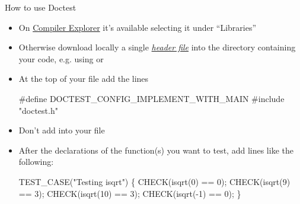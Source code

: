 \begin{frame}[fragile]{How to use Doctest}

  \begin{itemize}
  \item On \href{https://godbolt.org/}{Compiler Explorer} it's available
    selecting it under ``Libraries''
  \item Otherwise download locally a single
    \href{https://raw.githubusercontent.com/doctest/doctest/master/doctest/doctest.h}{\textit{header
        file}} into the directory containing your code, e.g. using 
    or 
  \item At the top of your \Cpp{} file add the lines
    \begin{codeblock}
#define DOCTEST\_CONFIG\_IMPLEMENT\_WITH\_MAIN
#include "doctest.h"\end{codeblock}
  \item Don't add  into your file
  \item After the declarations of the function(s) you want to test, add lines
    like the following:
    \begin{codeblock}
TEST_CASE("Testing isqrt") \{
  CHECK(isqrt(0) == 0);
  CHECK(isqrt(9) == 3);
  CHECK(isqrt(10) == 3);
  CHECK(isqrt(-1) == 0);
  \ddd
\}\end{codeblock}

  \end{itemize}

\end{frame}

